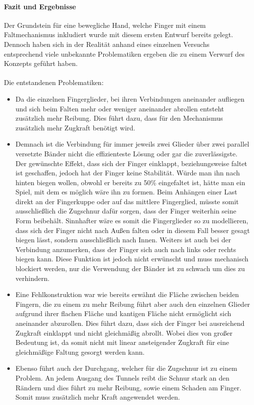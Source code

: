 \documentclass[titlepage,12pt,twoside]{article}
\begin{document}
\paragraph{Fazit und Ergebnisse}
\hfill \break
\hfill \break
Der Grundstein für eine bewegliche Hand, welche Finger mit einem 
Faltmechanismus inkludiert wurde mit diesem ersten Entwurf bereits gelegt. 
Dennoch haben sich in der Realität anhand eines einzelnen Versuchs 
entsprechend viele unbekannte Problematiken ergeben die zu einem Verwurf des 
Konzepts geführt haben. \\
\\
Die entstandenen Problematiken:
\begin{itemize}
	\item Da die einzelnen Fingerglieder, bei ihren Verbindungen aneinander 
	aufliegen und sich beim Falten mehr oder weniger aneinander abrollen 
	entsteht zusätzlich mehr Reibung. Dies führt dazu, dass für den Mechanismus 
	zusätzlich mehr Zugkraft benötigt wird.
	\item Demnach ist die Verbindung für immer jeweils zwei Glieder über zwei 
	parallel versetzte Bänder nicht die effizienteste Lösung oder gar die zuverlässigste. 
	Der gewünschte Effekt, dass sich der Finger einklappt, beziehungsweise 
	faltet ist geschaffen, jedoch hat der Finger keine Stabilität. Würde man 
	ihn nach hinten biegen wollen, obwohl er bereits zu 50\% eingefaltet ist, 
	hätte man ein Spiel, mit dem es möglich wäre ihn zu formen. Beim Anhängen 
	einer Last direkt an der Fingerkuppe oder auf das mittlere Fingerglied, 
	müsste somit ausschließlich die Zugschnur dafür sorgen, dass der Finger 
	weiterhin seine Form beibehält. Sinnhafter wäre es somit die Fingerglieder 
	so zu modellieren, dass sich der Finger nicht nach Außen falten oder in 
	diesem Fall besser gesagt biegen lässt, sondern ausschließlich nach Innen. 
	Weiters ist auch bei der Verbindung anzumerken, dass der Finger sich auch 
	nach links oder rechts biegen kann. Diese Funktion ist jedoch nicht 
	erwünscht und muss mechanisch blockiert werden, nur die Verwendung der 
	Bänder ist zu schwach um dies zu verhindern.
	\item Eine Fehlkonstruktion war wie bereits erwähnt die Fläche zwischen 
	beiden Fingern, die zu einem zu mehr Reibung führt aber auch den einzelnen 
	Glieder aufgrund ihrer flachen Fläche und kantigen Fläche nicht ermöglicht 
	sich aneinander abzurollen. Dies führt dazu, dass sich der Finger bei ausreichend 
	Zugkraft einklappt und nicht gleichmäßig abrollt. Wobei dies von großer 
	Bedeutung ist, da somit nicht mit linear ansteigender Zugkraft für eine 
	gleichmäßige Faltung gesorgt werden kann.
	\item Ebenso führt auch der Durchgang, welcher für die Zugschnur ist zu 
	einem Problem. An jedem Ausgang des Tunnels reibt die Schnur stark an den 
	Rändern und dies führt zu mehr Reibung, sowie einem Schaden am Finger.
	Somit muss zusätzlich mehr Kraft angewendet werden.
\end{itemize}
\end{document}
